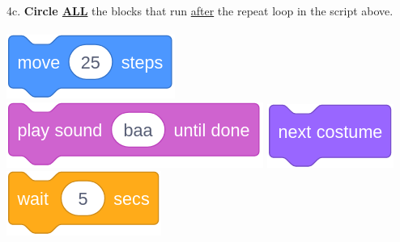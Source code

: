 \documentclass[letterpaper,12pt]{article}
\begin{document}
\noindent 4c. \textbf{Circle \underline{ALL}} the blocks that run \underline{after} the repeat loop in the script above. \\ \\
\includegraphics[scale=.3]{q4_script1.png} \hspace{1cm}
\includegraphics[scale=.3]{q4_script2.png} \hspace{1cm}
\includegraphics[scale=.3]{q4_script3.png} \hspace{1cm}
\includegraphics[scale=.3]{q4_script4.png} \hspace{1cm}\\

\noindent \dotfill \\
\end{document}
